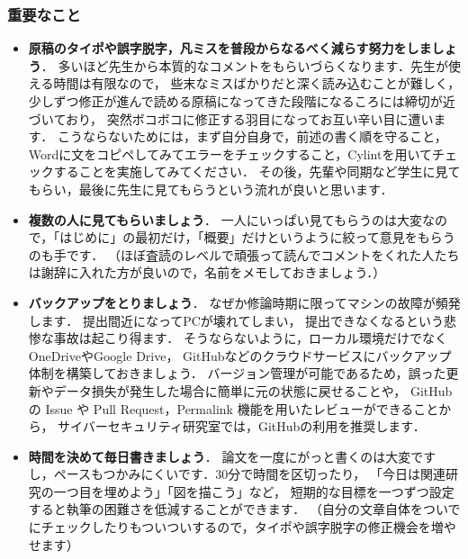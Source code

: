 \subsubsection{重要なこと}
\begin{itemize}
    \item \textbf{原稿のタイポや誤字脱字，凡ミスを普段からなるべく減らす努力をしましょう}．
    多いほど先生から本質的なコメントをもらいづらくなります．先生が使える時間は有限なので，
    些末なミスばかりだと深く読み込むことが難しく，少しずつ修正が進んで読める原稿になってきた段階になるころには締切が近づいており，
    突然ボコボコに修正する羽目になってお互い辛い目に遭います．
    こうならないためには，まず自分自身で，前述の書く順を守ること，Wordに文をコピペしてみてエラーをチェックすること，Cylint\cite{cylint}を用いてチェックすることを実施してみてください．
    その後，先輩や同期など学生に見てもらい，最後に先生に見てもらうという流れが良いと思います．
    \item \textbf{複数の人に見てもらいましょう}．
    一人にいっぱい見てもらうのは大変なので，「はじめに」の最初だけ，「概要」だけというように絞って意見をもらうのも手です．
    （ほぼ査読のレベルで頑張って読んでコメントをくれた人たちは謝辞に入れた方が良いので，名前をメモしておきましょう．）
    \item \textbf{バックアップをとりましょう}．
    なぜか修論時期に限ってマシンの故障が頻発します． 提出間近になってPCが壊れてしまい，
    提出できなくなるという悲惨な事故は起こり得ます． そうならないように，ローカル環境だけでなくOneDriveやGoogle Drive，
    GitHubなどのクラウドサービスにバックアップ体制を構築しておきましょう．
    バージョン管理が可能であるため，誤った更新やデータ損失が発生した場合に簡単に元の状態に戻せることや，
    GitHub の Issue や Pull Request，Permalink 機能を用いたレビューができることから，
    サイバーセキュリティ研究室では，GitHubの利用を推奨します\cite{cytex}．
    \item \textbf{時間を決めて毎日書きましょう}．
    論文を一度にがっと書くのは大変ですし，ペースもつかみにくいです．30分で時間を区切ったり，
    「今日は関連研究の一つ目を埋めよう」「図を描こう」など，
    短期的な目標を一つずつ設定すると執筆の困難さを低減することができます．
    （自分の文章自体をついでにチェックしたりもついついするので，タイポや誤字脱字の修正機会を増やせます）
\end{itemize}

